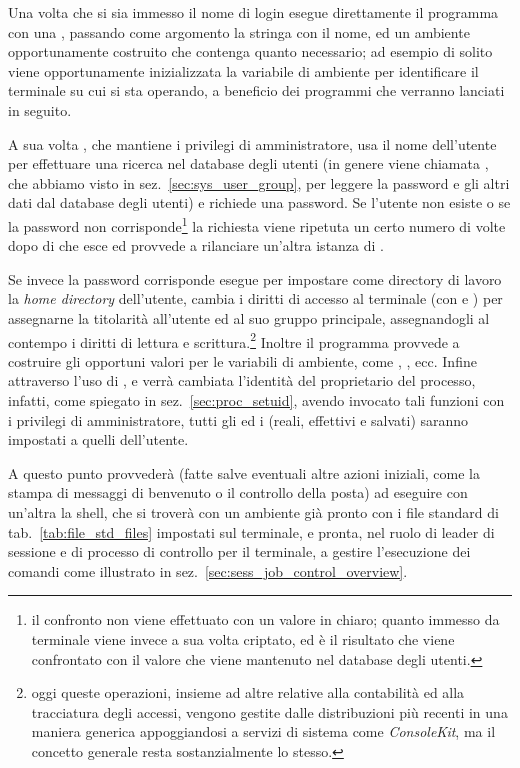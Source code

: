 Una volta che si sia immesso il nome di login  esegue direttamente
il programma  con una , passando come argomento la
stringa con il nome, ed un ambiente opportunamente costruito che contenga
quanto necessario; ad esempio di solito viene opportunamente inizializzata la
variabile di ambiente  per identificare il terminale su cui si
sta operando, a beneficio dei programmi che verranno lanciati in seguito.

A sua volta , che mantiene i privilegi di amministratore, usa il
nome dell'utente per effettuare una ricerca nel database degli utenti (in
genere viene chiamata , che abbiamo visto in
sez.~\ref{sec:sys_user_group}, per leggere la password e gli altri dati dal
database degli utenti) e richiede una password. Se l'utente non esiste o se la
password non corrisponde\footnote{il confronto non viene effettuato con un
  valore in chiaro; quanto immesso da terminale viene invece a sua volta
  criptato, ed è il risultato che viene confrontato con il valore che viene
  mantenuto nel database degli utenti.} la richiesta viene ripetuta un certo
numero di volte dopo di che  esce ed  provvede a
rilanciare un'altra istanza di .

Se invece la password corrisponde  esegue  per
impostare come directory di lavoro la \textit{home directory} dell'utente,
cambia i diritti di accesso al terminale (con  e ) per
assegnarne la titolarità all'utente ed al suo gruppo principale, assegnandogli
al contempo i diritti di lettura e scrittura.\footnote{oggi queste operazioni,
  insieme ad altre relative alla contabilità ed alla tracciatura degli
  accessi, vengono gestite dalle distribuzioni più recenti in una maniera
  generica appoggiandosi a servizi di sistema come \textit{ConsoleKit}, ma il
  concetto generale resta sostanzialmente lo stesso.}  Inoltre il programma
provvede a costruire gli opportuni valori per le variabili di ambiente, come
, , ecc.  Infine attraverso l'uso di ,
 e  verrà cambiata l'identità del proprietario
del processo, infatti, come spiegato in sez.~\ref{sec:proc_setuid}, avendo
invocato tali funzioni con i privilegi di amministratore, tutti gli 
ed i  (reali, effettivi e salvati) saranno impostati a quelli
dell'utente.

A questo punto  provvederà (fatte salve eventuali altre azioni
iniziali, come la stampa di messaggi di benvenuto o il controllo della posta)
ad eseguire con un'altra  la shell, che si troverà con un ambiente
già pronto con i file standard di tab.~\ref{tab:file_std_files} impostati sul
terminale, e pronta, nel ruolo di leader di sessione e di processo di
controllo per il terminale, a gestire l'esecuzione dei comandi come illustrato
in sez.~\ref{sec:sess_job_control_overview}.

